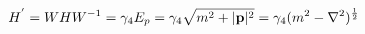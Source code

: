 \begin{equation}
H^{'}= W H W^{-1} = \gamma_{4} E_{p}= \gamma_{4} \sqrt{m^{2} +
|{\bf p}|^{2}} = \gamma_{4} (m^{2} - \nabla^{2})^{\frac{1}{2}}        \label{eq:hc}
\end{equation}


